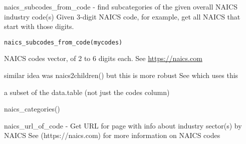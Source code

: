 \documentclass[a4paper]{book}
\begin{document}
%
\begin{Description}\relax
naics\_subcodes\_from\_code - find subcategories of the given overall NAICS industry code(s)
Given 3-digit NAICS code, for example, get all NAICS that start with those digits.
\end{Description}
%
\begin{Usage}
\begin{verbatim}
naics_subcodes_from_code(mycodes)
\end{verbatim}
\end{Usage}
%
\begin{Arguments}
\begin{ldescription}
\item[\code{mycodes}] NAICS codes vector, of 2 to 6 digits each. See \url{https://naics.com}
\end{ldescription}
\end{Arguments}
%
\begin{Details}\relax
similar idea was naics2children() but this is more robust
See  which uses this
\end{Details}
%
\begin{Value}
a subset of the  data.table (not just the codes column)
\end{Value}
%
\begin{SeeAlso}\relax
{}     
\end{SeeAlso}
%
\begin{Examples}
\begin{ExampleCode}
  naics_categories()
\end{ExampleCode}
\end{Examples}
%
\begin{Description}\relax
naics\_url\_of\_code - Get URL for page with info about industry sector(s) by NAICS
See (https://naics.com) for more information on NAICS codes
\end{Description}
\end{document}
